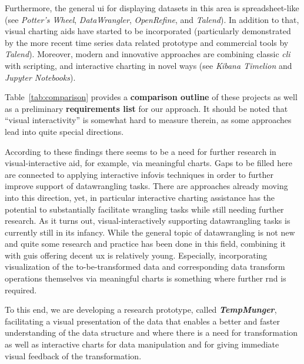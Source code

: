 Furthermore, the general \gls{ui} for displaying datasets in this area is spreadsheet-like (see \emph{Potter's Wheel}, \emph{DataWrangler}, \emph{OpenRefine}, and \emph{Talend}).
In addition to that, visual charting aids have started to be incorporated (particularly demonstrated by the more recent time series data related prototype and commercial tools by \emph{Talend}).
Moreover, modern and innovative approaches are combining classic \emph{\gls{cli}} with scripting, and interactive charting in novel ways (see \emph{Kibana Timelion} and \emph{Jupyter Notebooks}).

Table~\ref{tab:comparison} provides a \textbf{comparison outline} of these projects as well as a preliminary \textbf{requirements list} for our approach.
It should be noted that ``visual interactivity'' is somewhat hard to measure therein, as some approaches lead into quite special directions.

According to these findings there seems to be a need for further research in visual-interactive aid, for example, via meaningful charts.
Gaps to be filled here are connected to applying interactive \gls{infovis} techniques in order to further improve support of \gls{datawrangling} tasks.
There are approaches already moving into this direction, yet, in particular interactive charting assistance has the potential to substantially facilitate wrangling tasks while still needing further research.
As it turns out, visual-interactively supporting \gls{datawrangling} tasks is currently still in its infancy.
While the general topic of \gls{datawrangling} is not new and quite some research and practice has been done in this field, combining it with \gls{gui}s offering decent \gls{ux} is relatively young.
Especially, incorporating visualization of the to-be-transformed data and corresponding data transform operations themselves via meaningful charts is something where further \gls{rnd} is required.

To this end, we are developing a research prototype, called \emph{\textbf{TempMunger}}, facilitating a visual presentation of the data that enables a better and faster understanding of the data structure and where there is a need for transformation as well as interactive charts for data manipulation and for giving immediate visual feedback of the transformation.

